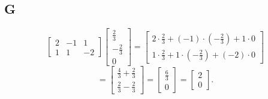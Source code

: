 \documentclass{article}
\begin{document}
\subsection*{G}

\[
	\begin{bmatrix}
		2 & -1 & 1  \\
		1 & 1  & -2
	\end{bmatrix}
	\begin{bmatrix}
		\frac{2}{3}  \\
		-\frac{2}{3} \\
		0
	\end{bmatrix}
	=
	\begin{bmatrix}
		2\cdot\frac{2}{3} + (-1)\cdot\left(-\frac{2}{3}\right) + 1\cdot 0 \\
		1\cdot\frac{2}{3} + 1\cdot\left(-\frac{2}{3}\right) + (-2)\cdot 0
	\end{bmatrix}
\]
\[
	=\begin{bmatrix}
		\frac{4}{3} + \frac{2}{3} \\
		\frac{2}{3} - \frac{2}{3}
	\end{bmatrix}
	=\begin{bmatrix}
		\frac{6}{3} \\
		0
	\end{bmatrix}
	=\begin{bmatrix}
		2 \\
		0
	\end{bmatrix}.
\]
\end{document}

